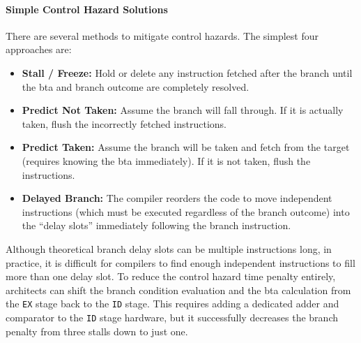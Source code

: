 \paragraph{Simple Control Hazard Solutions} 
There are several methods to mitigate control hazards. The simplest four approaches are:
\begin{itemize}
    \item \textbf{Stall / Freeze:} Hold or delete any instruction fetched after the branch until the \gls{bta} and branch outcome are completely resolved.
    \item \textbf{Predict Not Taken:} Assume the branch will fall through. If it is actually taken, flush the incorrectly fetched instructions.
    \item \textbf{Predict Taken:} Assume the branch will be taken and fetch from the target (requires knowing the \gls{bta} immediately). If it is not taken, flush the instructions.
    \item \textbf{Delayed Branch:} The compiler reorders the code to move independent instructions (which must be executed regardless of the branch outcome) into the ``delay slots'' immediately following the branch instruction.
\end{itemize}

Although theoretical branch delay slots can be multiple instructions long, in practice, it is difficult for compilers to find enough independent instructions to fill more than one delay slot. To reduce the control hazard time penalty entirely, architects can shift the branch condition evaluation and the \gls{bta} calculation from the \texttt{EX} stage back to the \texttt{ID} stage. This requires adding a dedicated adder and comparator to the \texttt{ID} stage hardware, but it successfully decreases the branch penalty from three stalls down to just one.

